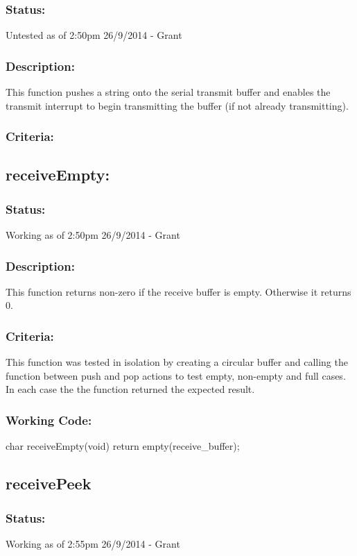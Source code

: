 \documentclass[]{article}
\begin{document}
\subsubsection{Status:}
Untested as of 2:50pm 26/9/2014 - Grant

\subsubsection{Description:}
This function pushes a string onto the serial transmit buffer and enables the transmit interrupt to begin transmitting the buffer (if not already transmitting).

\subsubsection{Criteria:}

\subsection{receiveEmpty:}
\subsubsection{Status:}
Working as of 2:50pm 26/9/2014 - Grant

\subsubsection{Description:}
This function returns non-zero if the receive buffer is empty. Otherwise it returns 0.

\subsubsection{Criteria:}
This function was tested in isolation by creating a circular buffer and calling the function between push and pop actions to test empty, non-empty and full cases. In each case the the function returned the expected result.

\subsubsection{Working Code:}
char receiveEmpty(void)
{
	return empty(receive\_buffer);
}


\subsection{receivePeek}
\subsubsection{Status:}
Working as of 2:55pm 26/9/2014 - Grant
\end{document}
